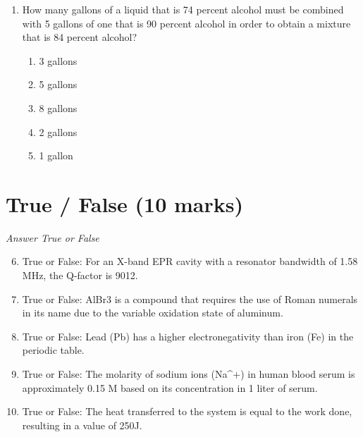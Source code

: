 \documentclass[12pt]{article}
\begin{document}
\begin{enumerate}[label=\arabic*.]
\begin{enumerate}[label=(\alph*)]
    \item Cu(OH)2
    \item Zn(NO3)2
    \item NiSO3
    \item MgCl2
    \item Mn(NO3)2
\end{enumerate}
\item How many gallons of a liquid that is 74 percent alcohol must be combined with 5 gallons of
one that is 90 percent alcohol in order to obtain a mixture that is 84 percent alcohol?
\begin{enumerate}[label=(\alph*)]
    \item 3 gallons
    \item 5 gallons
    \item 8 gallons
    \item 2 gallons
    \item 1 gallon
\end{enumerate}
\end{enumerate}

\section*{True / False (10 marks)}
\textit{Answer True or False}
\begin{enumerate}[label=\arabic*.]
\setcounter{enumi}{5}
\item True or False: For an X-band EPR cavity with a resonator bandwidth of 1.58 MHz, the Q-factor is 9012.
\item True or False: AlBr3 is a compound that requires the use of Roman numerals in its name due to the variable oxidation state of aluminum.
\item True or False: Lead (Pb) has a higher electronegativity than iron (Fe) in the periodic table.
\item True or False: The molarity of sodium ions (Na\^{}+) in human blood serum is approximately 0.15 M based on its concentration in 1 liter of serum.
\item True or False: The heat transferred to the system is equal to the work done, resulting in a value of 250J.
\end{enumerate}
\end{document}
